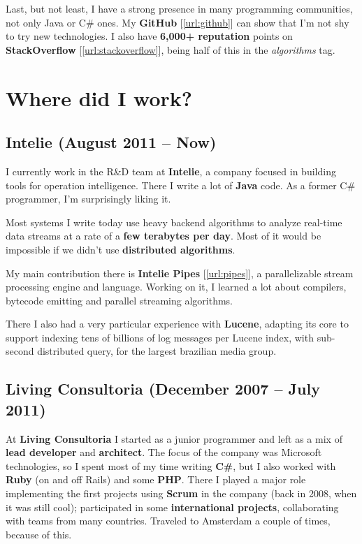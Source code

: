 \documentclass[a4paper,12pt,oneside]{article}
\begin{document}
	Last, but not least, I have a strong presence in many programming communities, not only Java or C\# ones. My \textbf{GitHub} [\ref{url:github}] can show that I'm not shy to try new technologies. I also have \textbf{6,000+ reputation} points on \textbf{StackOverflow} [\ref{url:stackoverflow}], being half of this in the \emph{algorithms} tag.

\section*{Where did I work?}

\subsection*{Intelie \small{ (August 2011 -- Now)}}

	I currently work in the R\&D team at \textbf{Intelie}, a company focused in building tools for
	operation intelligence. There I write a lot of \textbf{Java} code. As a former
	C\# programmer, I'm surprisingly liking it.

	Most systems I write today use heavy backend algorithms to analyze real-time
	data streams at a rate of a \textbf{few terabytes per day}. Most of it would be
	impossible if we didn't use \textbf{distributed algorithms}.
	
	My main contribution there is \textbf{Intelie Pipes} [\ref{url:pipes}], a parallelizable 
	stream processing engine and language. Working on it, I learned a lot
	about compilers, bytecode emitting and parallel streaming algorithms.

	There I also had a very particular experience with \textbf{Lucene}, adapting
	its core to support indexing tens of billions of log messages per Lucene
	index, with sub-second distributed query, for the largest brazilian media
	group.
\subsection*{Living Consultoria \small{ (December 2007 -- July 2011)}}

	At \textbf{Living Consultoria} I started as a junior programmer and left as a mix
	of \textbf{lead developer} and \textbf{architect}. The focus of the company was Microsoft 
	technologies, so I
	spent most of my time writing \textbf{C\#}, but I also worked with
	\textbf{Ruby} (on and off Rails) and some \textbf{PHP}. There I played a major
	role implementing the first projects using \textbf{Scrum} in the company (back
	in 2008, when it was still cool); participated in some \textbf{international
	projects}, collaborating with teams from many countries. Traveled to Amsterdam
	a couple of times, because of this.
\end{document}
